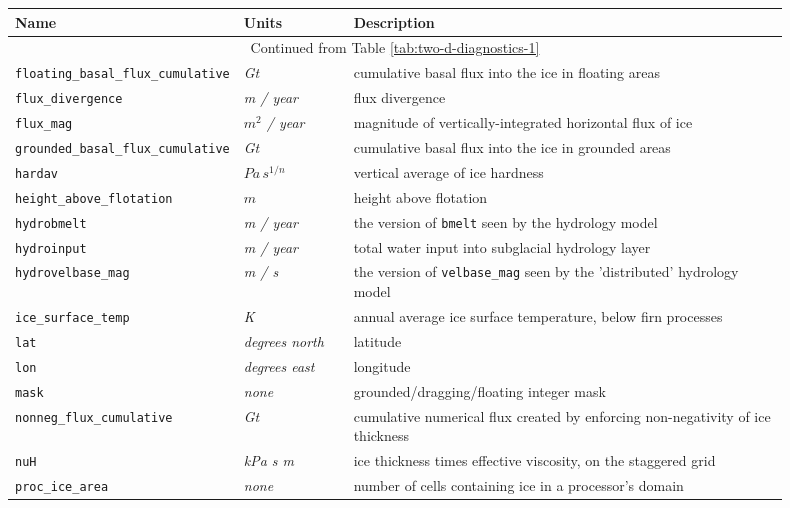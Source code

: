 \begin{table}[ht]
  \centering
  \begin{tabular}{p{0.15\linewidth}p{0.15\linewidth}p{0.6\linewidth}}
    \toprule
    \textbf{Name} & \textbf{Units} & \textbf{Description} \\
    \midrule
    \multicolumn{3}{c}{Continued from Table \ref{tab:two-d-diagnostics-1}}\\
    \texttt{floating_basal_flux_cumulative} & \textsl{Gt} & cumulative basal flux into the ice in floating areas \\
    \texttt{flux_divergence} & \textsl{m / year} &  flux divergence \\
    \texttt{flux_mag} & \textsl{$m^{2}$ / year} &  magnitude of vertically-integrated horizontal flux of ice \\
    \texttt{grounded_basal_flux_cumulative} & \textsl{Gt} & cumulative basal flux into the ice in grounded areas \\
    \texttt{hardav} & $Pa\, s^{1/n}$ &  vertical average of ice hardness \\
    \texttt{height_above_flotation} & $m$ &  height above flotation \\
    \texttt{hydrobmelt} & \textsl{m / year} & the version of \texttt{bmelt} seen by the hydrology model\\
    \texttt{hydroinput} & \textsl{m / year} & total water input into subglacial hydrology layer\\
    \texttt{hydrovelbase_mag} & \textsl{m / s} & the version of \texttt{velbase_mag} seen by the 'distributed' hydrology model\\
    \texttt{ice_surface_temp} & \textsl{K} & annual average ice surface temperature, below firn processes \\
    \texttt{lat} & \textsl{degrees north} & latitude \\
    \texttt{lon} & \textsl{degrees east} & longitude \\
    \texttt{mask} & \textsl{none} & grounded/dragging/floating integer mask \\
    \texttt{nonneg_flux_cumulative} & \textsl{Gt} & cumulative numerical flux created by enforcing non-negativity of ice thickness \\
    \texttt{nuH} & \textsl{kPa s m} & ice thickness times effective viscosity, on the staggered grid\\
    \texttt{proc_ice_area} & \textsl{none} &  number of cells containing ice in a processor's domain \\

\end{tabular}
\end{table}

